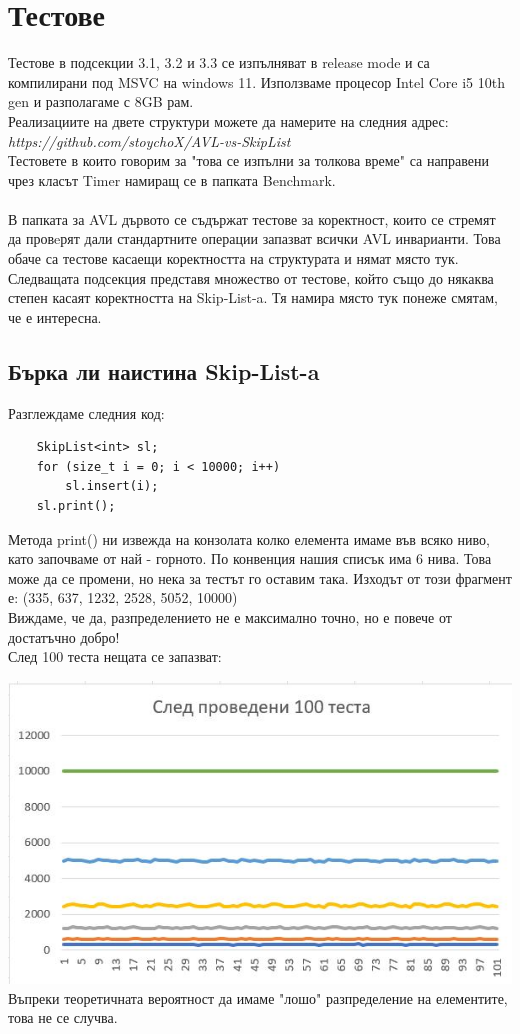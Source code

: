 \documentclass[a4paper,12pt,fleqn]{article}
\begin{document}
	\section{Тестове}
	Тестове в подсекции 3.1, 3.2 и 3.3 се изпълняват в release mode и са компилирани под MSVC на windows 11. Използваме процесор Intel Core i5 10th gen и разполагаме с 8GB рам.\\
	Реализациите на двете структури можете да намерите на следния адрес:\\
	\textit{https://github.com/stoychoX/AVL-vs-SkipList}
	\\Тестовете в които говорим за "това се изпълни за толкова време" са направени чрез класът Timer намиращ се в папката Benchmark.\\
	\\В папката за AVL дървото се съдържат тестове за коректност, които се стремят да провeрят дали стандартните операции запазват всички AVL инварианти. 
	Това обаче са тестове касаещи коректността на структурата и нямат място тук. Следващата подсекция представя множество от тестове, който също до някаква степен касаят коректността на Skip-List-a. Тя намира място тук понеже смятам, че е интересна.
	\subsection{Бърка ли наистина Skip-List-a}
	Разглеждаме следния код:
	\begin{lstlisting}
	SkipList<int> sl;
	for (size_t i = 0; i < 10000; i++)
		sl.insert(i);
	sl.print();
	\end{lstlisting}
	Метода print() ни извежда на конзолата колко елемента имаме във всяко ниво, като започваме от най - горното. По конвенция нашия списък има 6 нива. Това може да се промени, но нека за тестът го оставим така. Изходът от този фрагмент е:
	(335, 637, 1232, 2528, 5052, 10000)
	\\Виждаме, че да, разпределението не е максимално точно, но е повече от достатъчно добро!\\
	След 100 теста нещата се запазват:
	
	\includegraphics[scale=0.45]{insert-tests.jpg}\\
	Въпреки теоретичната вероятност да имаме "лошо" разпределение на елементите, това не се случва.
\end{document}
